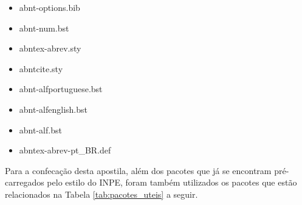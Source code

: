 \begin{itemize}
  \item abnt-options.bib
  \item abnt-num.bst
  \item abntex-abrev.sty
  \item abntcite.sty
  \item abnt-alfportuguese.bst
  \item abnt-alfenglish.bst
  \item abnt-alf.bst
  \item abntex-abrev-pt\_BR.def
\end{itemize}

Para a confecação desta apostila, além dos pacotes que já se encontram pré-carregados pelo estilo do INPE, foram também utilizados os pacotes que estão relacionados na Tabela \ref{tab:pacotes_uteis} a seguir.

